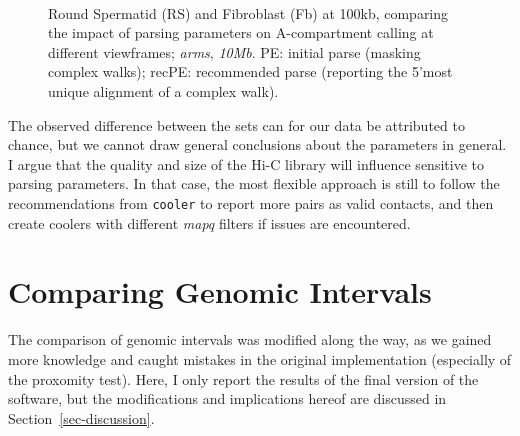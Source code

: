 \documentclass[
  11pt,
  a4paper,
]{scrbook}
\let\oldemph\emph
\renewcommand\emph[1]{\oldemph{\color{gray}#1}}
\begin{document}
\begin{figure}
\begin{minipage}{0.40\linewidth}
{}


\end{minipage}%
%
\begin{minipage}{0.40\linewidth}



\end{minipage}%
%
\begin{minipage}{0.10\linewidth}
~\end{minipage}%

\caption{\label{fig-rs-fb-100-pe-recpe-intervals}Round Spermatid (RS)
and Fibroblast (Fb) at 100kb, comparing the impact of parsing parameters
on A-compartment calling at different viewframes; \emph{arms},
\emph{10Mb}. PE: initial parse (masking complex walks); recPE:
recommended parse (reporting the 5'most unique alignment of a complex
walk).}

\end{figure}%

The observed difference between the sets can for our data be attributed
to chance, but we cannot draw general conclusions about the parameters
in general. I argue that the quality and size of the Hi-C library will
influence sensitive to parsing parameters. In that case, the most
flexible approach is still to follow the recommendations from
\texttt{cooler} to report more pairs as valid contacts, and then create
coolers with different \emph{mapq} filters if issues are encountered.

\section{Comparing Genomic Intervals}\label{comparing-genomic-intervals}

The comparison of genomic intervals was modified along the way, as we
gained more knowledge and caught mistakes in the original implementation
(especially of the proxomity test). Here, I only report the results of
the final version of the software, but the modifications and
implications hereof are discussed in Section~\ref{sec-discussion}.
\end{document}

